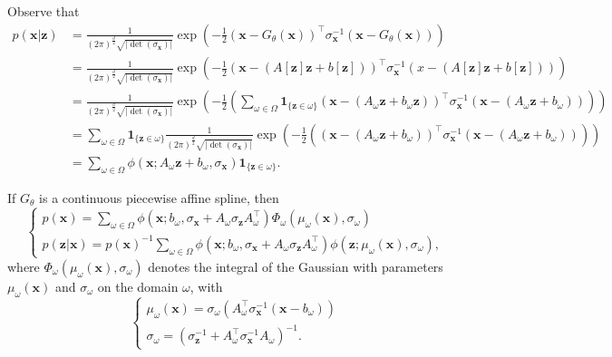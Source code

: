 \begin{tproof}
    Observe that
    \begin{align*}
        p(\mathbf{x}\vert\mathbf{z})&=\frac{1}{(2\pi)^{\frac{d}{2}}\sqrt{\left\vert\det\left(\sigma_{\mathbf{x}}\right)\right\vert}}\exp\left(-\frac{1}{2}\left(\mathbf{x}-G_{\theta}(\mathbf{x})\right)^\top\sigma_{\mathbf{x}}^{-1}\left(\mathbf{x}-G_{\theta}(\mathbf{x})\right)\right)\\&=\frac{1}{(2\pi)^{\frac{d}{2}}\sqrt{\left\vert\det\left(\sigma_{\mathbf{x}}\right)\right\vert}}\exp\left(-\frac{1}{2}\left(\mathbf{x}-(A[\mathbf{z}]\mathbf{z}+b[\mathbf{z}])\right)^\top\sigma_{\mathbf{x}}^{-1}\left(x-(A[\mathbf{z}]\mathbf{z}+b[\mathbf{z}])\right)\right)\\&=\frac{1}{(2\pi)^{\frac{d}{2}}\sqrt{\left\vert\det\left(\sigma_{\mathbf{x}}\right)\right\vert}}\exp\left(-\frac{1}{2}\left(\sum_{\omega\in\Omega}\mathbf{1}_{\{\mathbf{z}\in\omega\}}\left(\mathbf{x}-\left(A_{\omega}\mathbf{z}+b_{\omega}\mathbf{z}\right)\right)^\top\sigma_{\mathbf{x}}^{-1}\left(\mathbf{x}-\left(A_{\omega}\mathbf{z}+b_{\omega}\right)\right)\right)\right)\\&=\sum_{\omega\in\Omega}\mathbf{1}_{\{\mathbf{z}\in\omega\}}\frac{1}{(2\pi)^{\frac{d}{2}}\sqrt{\left\vert\det\left(\sigma_{\mathbf{x}}\right)\right\vert}}\exp\left(-\frac{1}{2}\left(\left(\mathbf{x}-\left(A_{\omega}\mathbf{z}+b_{\omega}\right)\right)^\top\sigma_{\mathbf{x}}^{-1}\left(\mathbf{x}-\left(A_{\omega}\mathbf{z}+b_{\omega}\right)\right)\right)\right)\\&=\sum_{\omega\in\Omega}\phi\left(\mathbf{x};A_{\omega}\mathbf{z}+b_{\omega},\sigma_{\mathbf{x}}\right)\mathbf{1}_{\{\mathbf{z}\in\omega\}}.
    \end{align*}
\end{tproof}

\begin{theorem}\label{thm:analytic_marginal_posterior}
    If $G_{\theta}$ is a continuous piecewise affine spline, then $$\begin{cases}p(\mathbf{x})=\sum_{\omega\in\Omega}\phi\left(\mathbf{x};b_{\omega},\sigma_{\mathbf{x}}+A_{\omega}\sigma_{\mathbf{z}}A_{\omega}^\top\right)\Phi_{\omega}\left(\mu_{\omega}(\mathbf{x}),\sigma_{\omega}\right)\\p(\mathbf{z}\vert\mathbf{x})=p(\mathbf{x})^{-1}\sum_{\omega\in\Omega}\phi\left(\mathbf{x};b_{\omega},\sigma_{\mathbf{x}}+A_{\omega}\sigma_{\mathbf{z}}A_{\omega}^\top\right)\phi\left(\mathbf{z};\mu_{\omega}(\mathbf{x}),\sigma_{\omega}\right),\end{cases}$$where $\Phi_{\omega}\left(\mu_{\omega}(\mathbf{x}),\sigma_{\omega}\right)$ denotes the integral of the Gaussian with parameters $\mu_{\omega}(\mathbf{x})$ and $\sigma_{\omega}$ on the domain $\omega$, with $$\begin{cases}\mu_{\omega}(\mathbf{x})=\sigma_{\omega}\left(A_{\omega}^\top\sigma_{\mathbf{x}}^{-1}\left(\mathbf{x}-b_{\omega}\right)\right)\\\sigma_{\omega}=\left(\sigma_{\mathbf{z}}^{-1}+A_{\omega}^\top\sigma_{\mathbf{x}}^{-1}A_{\omega}\right)^{-1}.\end{cases}$$
\end{theorem}


